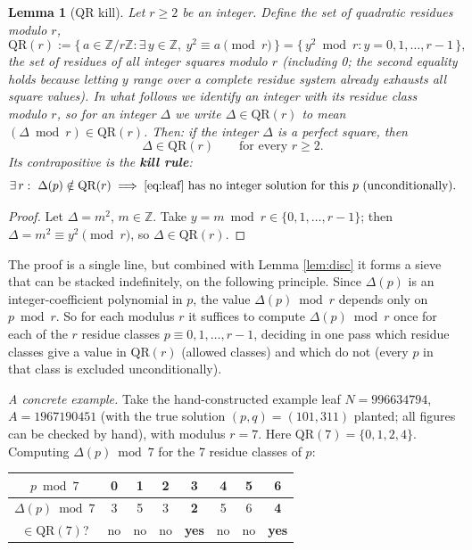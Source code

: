 \documentclass[11pt]{article}
\newtheorem{lemma}{Lemma}
\theoremstyle{remark}
\newcommand{\QR}{\mathrm{QR}}
\begin{document}
\begin{lemma}[QR kill]\label{lem:qr} Let $r \ge 2$ be an integer. Define the set of quadratic residues modulo $r$,
\[ \QR(r) := \{\, a \in \mathbb{Z}/r\mathbb{Z} : \exists\, y \in \mathbb{Z},\ y^2 \equiv a \pmod r \,\} = \{\, y^2 \bmod r : y = 0, 1, \dots, r-1 \,\},
\] the set of residues of all integer squares modulo $r$ (including 0; the second equality holds because letting $y$ range over a complete residue system already exhausts all square values). In what follows we identify an integer with its residue class modulo $r$, so for an integer $\Delta$ we write $\Delta \in \QR(r)$ to mean $(\Delta \bmod r) \in \QR(r)$. Then: if the integer $\Delta$ is a perfect square, then
\[ \Delta \in \QR(r) \qquad \text{for every } r \ge 2.
\] Its contrapositive is the \textbf{kill rule}:
\[ \exists\, r:\ \Delta(p) \notin \QR(r) \implies \text{\eqref{eq:leaf} has no integer solution for this } p \text{ (unconditionally)}.
\]
\end{lemma}

\begin{proof} Let $\Delta = m^2$, $m \in \mathbb{Z}$. Take $y = m \bmod r \in \{0, 1, \dots, r-1\}$; then $\Delta = m^2 \equiv y^2 \pmod r$, so $\Delta \in \QR(r)$.
\end{proof}

The proof is a single line, but combined with Lemma \ref{lem:disc} it forms a sieve that can be stacked indefinitely, on the following principle. Since $\Delta(p)$ is an integer-coefficient polynomial in $p$, the value $\Delta(p) \bmod r$ depends only on $p \bmod r$. So for each modulus $r$ it suffices to compute $\Delta(p) \bmod r$ once for each of the $r$ residue classes $p \equiv 0, 1, \dots, r-1$, deciding in one pass which residue classes give a value in $\QR(r)$ (allowed classes) and which do not (every $p$ in that class is excluded unconditionally).

\emph{A concrete example.} Take the hand-constructed example leaf $N = 996634794$, $A = 1967190451$ (with the true solution $(p, q) = (101, 311)$ planted; all figures can be checked by hand), with modulus $r = 7$. Here $\QR(7) = \{0, 1, 2, 4\}$. Computing $\Delta(p) \bmod 7$ for the 7 residue classes of $p$:

\begin{center}
\begin{tabular}{c|ccccccc} $p \bmod 7$ & 0 & 1 & 2 & 3 & 4 & 5 & 6 \\ \hline $\Delta(p) \bmod 7$ & 3 & 5 & 3 & \textbf{2} & 5 & 6 & \textbf{4} \\
$\in \QR(7)$? & no & no & no & \textbf{yes} & no & no & \textbf{yes} \\
\end{tabular}
\end{center}
\end{document}
